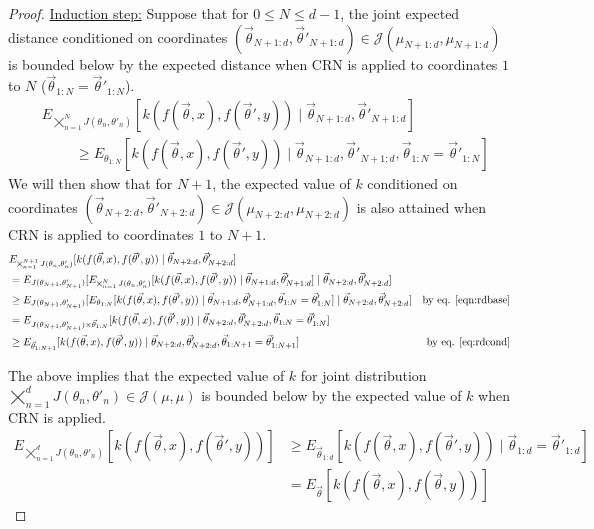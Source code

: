 \documentclass[12pt]{article}
\theoremstyle{plain}%
\theoremstyle{definition}
\begin{document}
\begin{proof}
	\underline{Induction step:} Suppose that for $0\leq N\leq d-1$, the joint expected distance conditioned on coordinates $(\vec{\theta}_{N+1:d}, \vec{\theta}'_{N+1:d})\in \mathcal{J}(\mu_{N+1:d},\mu_{N+1:d})$ is bounded below by the expected distance when CRN is applied to coordinates $1$ to $N$ ($\vec{\theta}_{1:N}=\vec{\theta}'_{1:N}$). 
	\begin{align}\label{eqn:rdbase}
		&E_{\bigtimes_{n=1}^N J(\theta_n,\theta'_{n})}[k(f( \vec{\theta},x),f(\vec{\theta}',y))\mid \vec{\theta}_{N+1:d}, \vec{\theta}'_{N+1:d}]\\
		&\hspace{1cm}\geq E_{\theta_{1:N}}[k(f( \vec{\theta},x),f(\vec{\theta}',y))\mid \vec{\theta}_{N+1:d}, \vec{\theta}'_{N+1:d},\vec{\theta}_{1:N}=\vec{\theta}'_{1:N}]
	\end{align}
	We will then show that for $N+1$, the expected value of $k$ conditioned on coordinates $(\vec{\theta}_{N+2:d}, \vec{\theta}'_{N+2:d})\in \mathcal{J}(\mu_{N+2:d},\mu_{N+2:d})$ is also attained when CRN is applied to coordinates $1$ to $N+1$. 
	\begin{align*}
		&E_{\bigtimes_{n=1}^{N+1} J(\theta_n,\theta'_{n})}[k(f( \vec{\theta},x),f(\vec{\theta}',y))\mid \vec{\theta}_{N+2:d}, \vec{\theta}'_{N+2:d}]\\
		&= E_{J(\theta_{N+1},\theta'_{N+1})}[E_{\bigtimes_{n=1}^N J(\theta_n,\theta'_{n})}[k(f( \vec{\theta},x),f(\vec{\theta}',y))\mid \vec{\theta}_{N+1:d}, \vec{\theta}'_{N+1:d}]\mid \vec{\theta}_{N+2:d}, \vec{\theta}'_{N+2:d}]\\
		&\geq E_{J(\theta_{N+1},\theta'_{N+1})}[E_{\theta_{1:N}}[k(f( \vec{\theta},x),f(\vec{\theta}',y))\mid \vec{\theta}_{N+1:d}, \vec{\theta}'_{N+1:d},\vec{\theta}_{1:N}=\vec{\theta}'_{1:N}]\mid \vec{\theta}_{N+2:d}, \vec{\theta}'_{N+2:d}]&\text{by eq. \ref{eqn:rdbase}}\\
		&= E_{J(\theta_{N+1},\theta'_{N+1})\times \vec{\theta}_{1:N}}[k(f( \vec{\theta},x),f(\vec{\theta}',y))\mid \vec{\theta}_{N+2:d}, \vec{\theta}'_{N+2:d}, \vec{\theta}_{1:N}=\vec{\theta}'_{1:N}]\\
		&\geq E_{\vec{\theta}_{1:N+1}}[k(f( \vec{\theta},x),f(\vec{\theta}',y))\mid \vec{\theta}_{N+2:d}, \vec{\theta}'_{N+2:d}, \vec{\theta}_{1:N+1}=\vec{\theta}'_{1:N+1}]&\text{by eq. \ref{eq:rdcond}}
	\end{align*}
	
	The above implies that the expected value of $k$ for joint distribution $\bigtimes_{n=1}^d J(\theta_n,\theta'_{n})\in \mathcal{J}(\mu,\mu) $ is bounded below by the expected value of $k$ when CRN is applied.
	\begin{align}
		E_{\bigtimes_{n=1}^d J(\theta_n,\theta'_{n})}[k(f( \vec{\theta},x),f(\vec{\theta}',y))]&\geq E_{\vec{\theta}_{1:d}}[k(f( \vec{\theta},x),f(\vec{\theta}',y))\mid \vec{\theta}_{1:d}=\vec{\theta}'_{1:d}] \\
		&=E_{\vec{\theta}}[k(f( \vec{\theta},x),f(\vec{\theta},y))]
	\end{align}
	

\end{proof}
\end{document}
